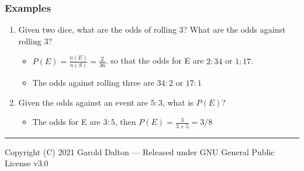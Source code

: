 \documentclass[14pt]{extarticle}
\begin{document}
\subsubsection{Examples}
\begin{enumerate}
	\item Given two dice, what are the odds of rolling 3? What are the odds against rolling 3?
	\begin{itemize}
		\item $P(E) = \frac{n(E)}{n(S)} = \frac{2}{36}$. so that the odds for E are $2:34$ or $1:17$.
		\item The odds against rolling three are $34:2$ or $17:1$
	\end{itemize}
	\item Given the odds against an event are $5:3$, what is $P(E)$?
	\begin{itemize}
		\item The odds for E are $3:5$, then $P(E)=\frac{3}{3+5} = 3/8$
	\end{itemize}
\end{enumerate}



\noindent\rule{\textwidth}{1pt}
{\footnotesize Copyright (C) 2021 Garold Dalton --- Released under GNU General Public License v3.0}


\cleardoublepage
\end{document}
